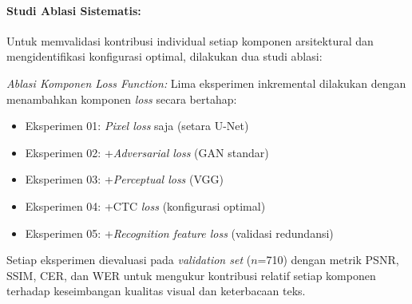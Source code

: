 \documentclass[12pt,a4paper]{article}
\begin{document}
% 

\paragraph{Studi Ablasi Sistematis:}
Untuk memvalidasi kontribusi individual setiap komponen arsitektural dan mengidentifikasi konfigurasi optimal, dilakukan dua studi ablasi:

\textit{Ablasi Komponen Loss Function:} Lima eksperimen inkremental dilakukan dengan menambahkan komponen \textit{loss} secara bertahap:
\begin{itemize}[leftmargin=1.5cm, nosep]
\item Eksperimen 01: \textit{Pixel loss} saja (setara U-Net)
\item Eksperimen 02: +\textit{Adversarial loss} (GAN standar)
\item Eksperimen 03: +\textit{Perceptual loss} (VGG)
\item Eksperimen 04: +CTC \textit{loss} (konfigurasi optimal)
\item Eksperimen 05: +\textit{Recognition feature loss} (validasi redundansi)
\end{itemize}
Setiap eksperimen dievaluasi pada \textit{validation set} ($n$=710) dengan metrik PSNR, SSIM, CER, dan WER untuk mengukur kontribusi relatif setiap komponen terhadap keseimbangan kualitas visual dan keterbacaan teks.
\end{document}
